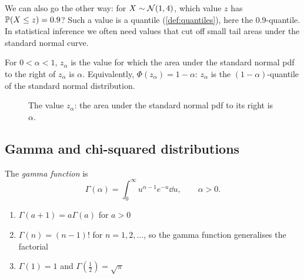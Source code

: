 We can also go the other way: for $X \sim \mathcal{N}(1, 4)$, which value $z$ has $\mathbb{P}(X \le z) = 0.9$? Such a value is a quantile (\cref{def:quantiles}), here the $0.9$-quantile. In statistical inference we often need values that cut off small tail areas under the standard normal curve.

\begin{definition}[$z_\alpha$]\label{def:z-alpha}
For $0 < \alpha < 1$, $z_\alpha$ is the value for which the area under the standard normal pdf to the right of $z_\alpha$ is $\alpha$. Equivalently, $\Phi(z_\alpha) = 1 - \alpha$: $z_\alpha$ is the $(1 - \alpha)$-quantile of the standard normal distribution.
\end{definition}

\begin{figure}[H]
\centering
{}
\caption{The value $z_\alpha$: the area under the standard normal pdf to its right is $\alpha$.}
\label{fig:z-alpha}
\end{figure}


\subsection{Gamma and chi-squared distributions}\label{sec:gamma}

\begin{definition}\label{def:gamma-function}
The \emph{gamma function} is
\[
  \Gamma(\alpha) = \int_0^\infty u^{\alpha - 1} e^{-u} \dd u, \qquad \alpha > 0.
\]
\end{definition}

\begin{theorem}\label{thm:gamma-function-properties}
\leavevmode
\begin{enumerate}
  \item $\Gamma(a + 1) = a\Gamma(a)$ for $a > 0$
  \item $\Gamma(n) = (n - 1)!$ for $n = 1, 2, \ldots$, so the gamma function generalises the factorial
  \item $\Gamma(1) = 1$ and $\Gamma(\tfrac12) = \sqrt\pi$
\end{enumerate}
\end{theorem}

